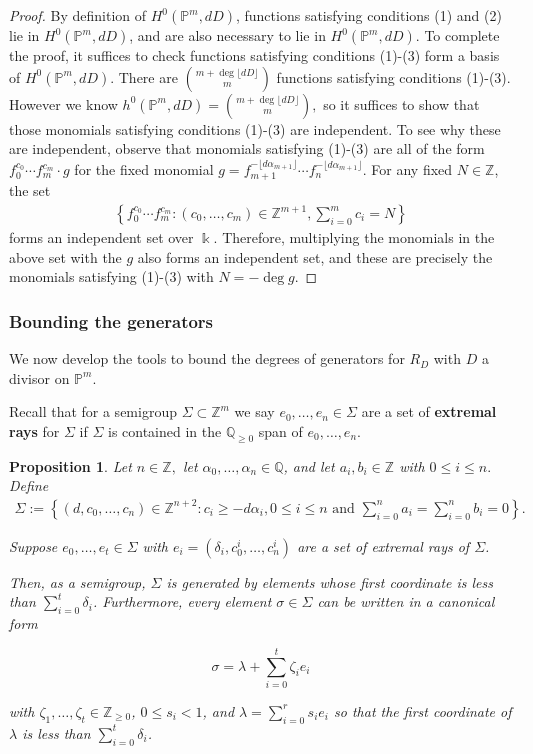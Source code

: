\documentclass{amsart}
\theoremstyle{plain}
\newtheorem{prop}[thm]{Proposition}
\theoremstyle{definition}
\theoremstyle{remark}
\numberwithin{equation}{section}
\newcommand\sssec{\subsubsection}
\newcommand\bq{{\mathbb Q}}
\newcommand\bp{{\mathbb P}}
\newcommand\bz{{\mathbb Z}}
\newcommand\bk{{\Bbbk}}
\newcommand\pdeg{\delta}
\begin{document}
\begin{proof}
By definition of $H^0(\bp^m,dD)$, functions satisfying conditions 
(1) and (2) lie in $H^0(\mathbb{P}^m,dD)$, and are also necessary to lie in
$H^0(\mathbb{P}^m,dD)$.
To complete the proof, it
suffices to check functions satisfying conditions (1)-(3) form
a basis of $H^0(\bp^m,dD)$. There are $\binom{m+ \deg \lfloor dD \rfloor }{m}$
functions satisfying conditions (1)-(3). However we know
$h^0(\bp^m,dD) = \binom{m+ \deg \lfloor dD \rfloor }{m},$ so it suffices to show
that those monomials satisfying conditions (1)-(3) are
independent. 
To see why these are independent, observe that monomials satisfying (1)-(3) are all of the form
$f_0^{c_0} \cdots f_m^{c_m} \cdot g$ for the fixed monomial
$g = f_{m+1}^{-\lfloor d\alpha_{m+1} \rfloor} \cdots f_n^{-\lfloor d\alpha_{m+1} \rfloor}$.
For any fixed $N \in \bz$, the set 
\begin{align*}
 \left\{ f_0^{c_0} \cdots f_m^{c_m} : (c_0, \ldots, c_m) \in \bz^{m+1}, \sum_{i=0}^m c_i = N \right\}	
\end{align*}
forms an independent set over $\bk$.
Therefore, multiplying the monomials in the above set with the $g$ also forms an independent set, and these are precisely the monomials satisfying (1)-(3) 
with $N = -\deg g$.
\end{proof}

\sssec*{Bounding the generators}
\label{sssec:bounding-generators}

We now develop the tools to bound the degrees of generators for $R_D$ with $D$ a divisor on $\bp^m$.


Recall that for a semigroup $\Sigma \subset \bz^m$ we say $e_0, \ldots, e_n \in \Sigma$ are a set of {\bf extremal rays}
for $\Sigma$ if 
$\Sigma$ is contained in the $\bq_{\geq 0}$ span of
$e_0, \ldots, e_n$.

\begin{prop}
\label{prop:cone-generation}
Let $n \in \bz,$ let $\alpha_0, \ldots, \alpha_n \in \bq$, and let
$a_i, b_i \in \bz$ with $0 \leq i \leq n.$ Define
\begin{align*}
	\Sigma := \left \{(d, c_0, \ldots, c_n) \in \bz^{n + 2} \colon c_i \geq -
	d \alpha_i, 0 \leq i \leq n \text{ and } \sum_{i = 0}^{n} a_i =
	\sum_{i	= 0}^{n}b_i = 0 \right \}.
\end{align*}

\noindent
Suppose $e_0, \ldots, e_t \in \Sigma$ with $e_i = (\pdeg_i, c_0^i,
\ldots, c_n^i)$ are a set of extremal rays of $\Sigma$.

Then, as a semigroup, $\Sigma$ is generated by
elements whose first coordinate is less than $\sum_{i = 0}^{t}
\pdeg_i$. Furthermore, every element $\sigma \in \Sigma$ can be
written in a canonical form 

\begin{equation}
	\label{eqn:sigma-canonical-form}
	\sigma = \lambda + \sum_{i = 0}^{t} \zeta_i e_i
\end{equation}

\noindent
with $\zeta_1, \ldots, \zeta_t \in \bz_{\geq 0}$, $0 \leq s_i < 1$, and $\lambda = \sum_{i = 0}^{r} s_i e_i$ 
so that the
first coordinate of $\lambda$ is less than $\sum_{i=0}^{t}\pdeg_i$.
\end{prop}
\end{document}

